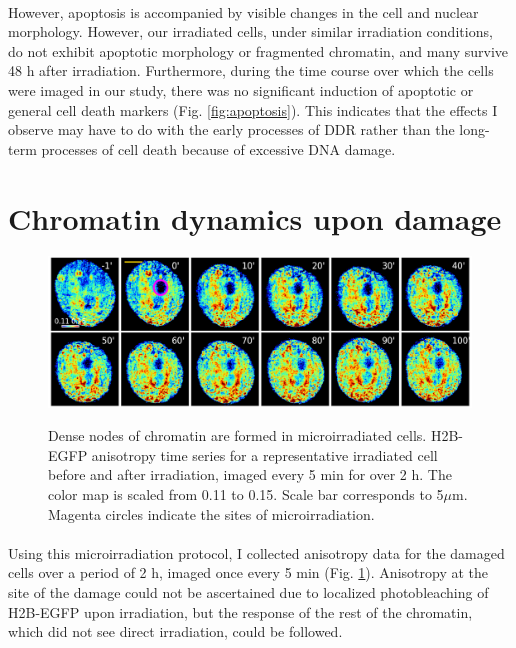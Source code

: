 \paragraph*{} However, apoptosis is accompanied by visible changes in the cell and nuclear morphology. However, our irradiated cells, under similar irradiation conditions, do not exhibit apoptotic morphology or fragmented chromatin, and many survive 48 h after irradiation. Furthermore, during the time course over which the cells were imaged in our study, there was no significant induction of apoptotic or general cell death markers (Fig. {\ref{fig:apoptosis}}). This indicates that the effects I observe may have to do with the early processes of DDR rather than the long-term processes of cell death because of excessive DNA damage.


\section{Chromatin dynamics upon damage}
\begin{figure}[!htp]
    {\hfill\includegraphics[clip,width=1\linewidth]{figures/live_an.png}\hspace*{\fill}}
    \caption{Dense nodes of chromatin are formed in microirradiated cells. H2B-EGFP anisotropy time series for a representative irradiated cell before and after irradiation, imaged every 5 min for over 2 h. The color map is scaled from 0.11 to 0.15. Scale bar corresponds to 5$\mu$m. Magenta circles indicate the sites of microirradiation.}
    {\label{fig:live_an}}
\end{figure}

\paragraph*{} Using this microirradiation protocol, I collected anisotropy data for the damaged cells over a period of 2 h, imaged once every 5 min (Fig. {\ref{fig:live_an}}). Anisotropy at the site of the damage could not be ascertained due to localized photobleaching of H2B-EGFP upon irradiation, but the response of the rest of the chromatin, which did not see direct irradiation, could be followed. 


